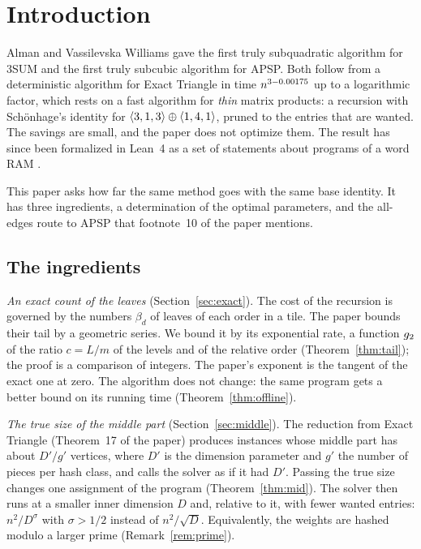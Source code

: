 \section{Introduction}
\label{sec:intro}

Alman and Vassilevska Williams \cite{AV} gave the first truly subquadratic
algorithm for 3SUM and the first truly subcubic algorithm for APSP.  Both
follow from a deterministic algorithm for Exact Triangle in time
\(n^{3-0.00175}\) up to a logarithmic factor, which rests on a fast algorithm
for \emph{thin} matrix products: a recursion with Sch\"onhage's identity for
\(\langle 3,1,3\rangle\oplus\langle 1,4,1\rangle\), pruned to the entries that are wanted.  The
savings are small, and the paper does not optimize them.  The result has since
been formalized in Lean~4 as a set of statements about programs of a word RAM
\cite{upstream}.

This paper asks how far the same method goes with the same base identity.  It
has three ingredients, a determination of the optimal parameters, and the
all-edges route to APSP that footnote~10 of the paper mentions.

\subsection*{The ingredients}

\emph{An exact count of the leaves} (Section~\ref{sec:exact}).  The cost of the
recursion is governed by the numbers \(\beta_d\) of leaves of each order in a
tile.  The paper bounds their tail by a geometric series.  We bound it by its
exponential rate, a function \(g_{2}\) of the ratio \(c=L/m\) of the levels and
of the relative order (Theorem~\ref{thm:tail}); the proof is a comparison of
integers.  The paper's exponent is the tangent of the exact one at zero.  The
algorithm does not change: the same program gets a better bound on its running
time (Theorem~\ref{thm:offline}).

\emph{The true size of the middle part} (Section~\ref{sec:middle}).  The
reduction from Exact Triangle (Theorem~17 of the paper) produces instances
whose middle part has about \(D'/g'\) vertices, where \(D'\) is the dimension
parameter and \(g'\) the number of pieces per hash class, and calls the solver
as if it had \(D'\).  Passing the true size changes one assignment of the
program (Theorem~\ref{thm:mid}).  The solver then runs at a smaller inner
dimension \(D\) and, relative to it, with fewer wanted entries:
\(n^{2}/D^{\sigma}\) with \(\sigma>1/2\) instead of \(n^{2}/\sqrt D\).
Equivalently, the weights are hashed modulo a larger prime
(Remark~\ref{rem:prime}).

